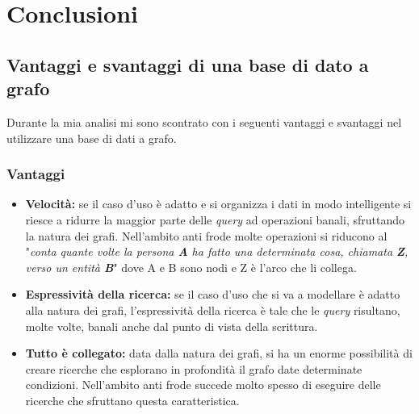 \newpage
\section{Conclusioni}
\subsection{Vantaggi e svantaggi di una base di dato a grafo}
Durante la mia analisi mi sono scontrato con i seguenti vantaggi e svantaggi nel utilizzare una base di dati a grafo.
\subsubsection{Vantaggi}
\begin{itemize}
\item{\textbf{Velocità:}} se il caso d'uso è adatto e si organizza i dati in modo intelligente si riesce a ridurre la maggior parte delle \textit{query} ad operazioni banali, sfruttando la natura dei grafi. Nell'ambito anti frode molte operazioni si riducono al "\textit{conta quante volte la persona \textbf{A} ha fatto una determinata cosa, chiamata \textbf{Z}, verso un entità \textbf{B}}" dove A e B sono nodi e Z è l'arco che li collega.
\item{\textbf{Espressività della ricerca:}} se il caso d'uso che si va a modellare è adatto alla natura dei grafi, l'espressività della ricerca è tale che le \textit{query} risultano, molte volte, banali anche dal punto di vista della scrittura.
\item{\textbf{Tutto è collegato:}} data dalla natura dei grafi, si ha un enorme possibilità di creare ricerche che esplorano in profondità il grafo date determinate condizioni. Nell'ambito anti frode succede molto spesso di eseguire delle ricerche che sfruttano questa caratteristica.
\end{itemize}
